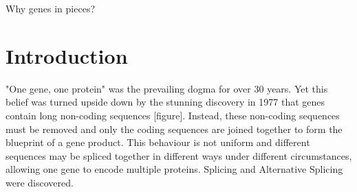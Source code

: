 \begin{savequote}[8cm]
Why genes in pieces?
\end{savequote}

\chapter{\label{ch:1-intro}Introduction} 
"One gene, one protein" was the prevailing dogma for over 30 years. Yet this belief was turned upside down by the stunning discovery in 1977 that genes contain long non-coding sequences \cite{discoveryofsplicing} [figure]. Instead, these non-coding sequences must be removed and only the coding sequences are joined together to form the blueprint of a gene product. This behaviour is not uniform and different sequences may be spliced together in different ways under different circumstances, allowing one gene to encode multiple proteins. Splicing and Alternative Splicing were discovered. 

%

